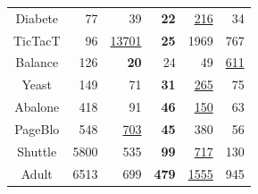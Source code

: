 \begin{table}
\begin{center}
\begin{tabular}{crrrrr}
 Diabete &    77 &                 39 &   \textbf{22} &   \underline{216} &               34 \\
 TicTacT &    96 &  \underline{13701} &   \textbf{25} &              1969 &              767 \\
 Balance &   126 &        \textbf{20} &            24 &                49 &  \underline{611} \\
   Yeast &   149 &                 71 &   \textbf{31} &   \underline{265} &               75 \\
 Abalone &   418 &                 91 &   \textbf{46} &   \underline{150} &               63 \\
 PageBlo &   548 &    \underline{703} &   \textbf{45} &               380 &               56 \\
 Shuttle &  5800 &                535 &   \textbf{99} &   \underline{717} &              130 \\
   Adult &  6513 &                699 &  \textbf{479} &  \underline{1555} &              945 \\
\end{tabular}
\end{center}
\end{table}
